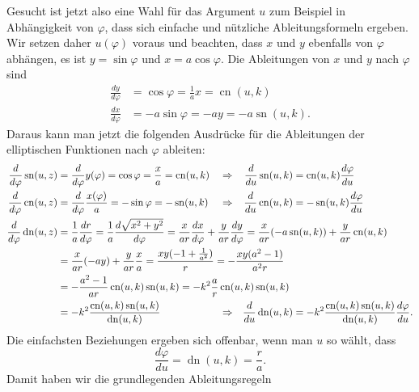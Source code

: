 Gesucht ist jetzt also eine Wahl für das Argument $u$ zum Beispiel in
Abhängigkeit von $\varphi$, dass sich einfache und nützliche
Ableitungsformeln ergeben.
Wir setzen daher $u(\varphi)$ voraus und beachten, dass $x$ und $y$
ebenfalls von $\varphi$ abhängen, es ist
$y=\sin\varphi$ und $x=a\cos\varphi$.
Die Ableitungen von $x$ und $y$ nach $\varphi$ sind
\begin{align*}
\frac{dy}{d\varphi}
&=
\cos\varphi
=
\frac{1}{a} x
=
\operatorname{cn}(u,k)
\\
\frac{dx}{d\varphi}
&=
-a\sin\varphi
=
-a y
=
-a\operatorname{sn}(u,k).
\end{align*}
Daraus kann man jetzt die folgenden Ausdrücke für die Ableitungen der
elliptischen Funktionen nach $\varphi$ ableiten:
\begin{align*}
\frac{d}{d\varphi} \operatorname{sn}(u,z)
&=
\frac{d}{d\varphi} y(\varphi)
=
\cos\varphi
=
\frac{x}{a}
=
\operatorname{cn}(u,k)
&&\Rightarrow&
\frac{d}{du}
\operatorname{sn}(u,k)
&=
\operatorname{cn}(u,k) \frac{d\varphi}{du}
\\
\frac{d}{d\varphi} \operatorname{cn}(u,z)
&=
\frac{d}{d\varphi} \frac{x(\varphi)}{a}
=
-\sin\varphi
=
-\operatorname{sn}(u,k)
&&\Rightarrow&
\frac{d}{du}\operatorname{cn}(u,k)
&=
-\operatorname{sn}(u,k) \frac{d\varphi}{du}
\\
\frac{d}{d\varphi} \operatorname{dn}(u,z)
&=
\frac{1}{a}\frac{dr}{d\varphi}
=
\frac{1}{a}\frac{d\sqrt{x^2+y^2}}{d\varphi}
\rlap{$\displaystyle\mathstrut
=
\frac{x}{ar} \frac{dx}{d\varphi}
+
\frac{y}{ar} \frac{dy}{d\varphi}
=
\frac{x}{ar} (-a\operatorname{sn}(u,k))
+
\frac{y}{ar} \operatorname{cn}(u,k)
$}
\\
&
\rlap{$\displaystyle\mathstrut
=
\frac{x}{ar}(-ay)
+
\frac{y}{ar} \frac{x}{a}
=
\frac{xy(-1+\frac{1}{a^2})}{r} 
=
-\frac{xy(a^2-1)}{a^2r} 
$}
\\
&=
-\frac{a^2-1}{ar}
\operatorname{cn}(u,k) \operatorname{sn}(u,k)
\rlap{$\displaystyle\mathstrut
=
-k^2
\frac{a}{r}
\operatorname{cn}(u,k) \operatorname{sn}(u,k)
$}
\\
&=
-k^2\frac{\operatorname{cn}(u,k)\operatorname{sn}(u,k)}{\operatorname{dn}(u,k)}
&&\Rightarrow&
\frac{d}{du} \operatorname{dn}(u,k)
&=
-k^2\frac{\operatorname{cn}(u,k)
\operatorname{sn}(u,k)}{\operatorname{dn}(u,k)}
\frac{d\varphi}{du}.
\end{align*}
Die einfachsten Beziehungen ergeben sich offenbar, wenn man $u$ so
wählt, dass
\[
\frac{d\varphi}{du}
=
\operatorname{dn}(u,k)
=
\frac{r}{a}.
\]
Damit haben wir die grundlegenden Ableitungsregeln

